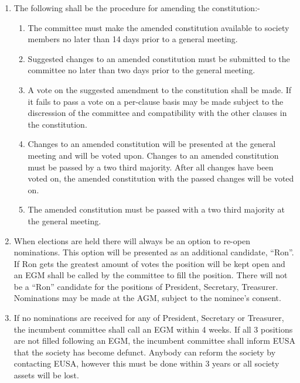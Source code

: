 \documentclass[a4paper]{article}
\begin{document}
\begin{enumerate}
  \item The following shall be the procedure for amending the constitution:-
    \begin{enumerate}
      \item The committee must make the amended constitution available to
        society members no later than 14 days prior to a general meeting.
      \item Suggested changes to an amended constitution must be submitted to
        the committee no later than two days prior to the general meeting.
      \item A vote on the suggested amendment to the constitution shall be
        made. If it fails to pass a vote on a per-clause basis may be made 
        subject to the discression of the committee and compatibility with the 
        other clauses in the constitution.
      \item Changes to an amended constitution will be presented at the general
        meeting and will be voted upon. Changes to an amended constitution
        must be passed by a two third majority. After all changes have been
        voted on, the amended constitution with the passed changes will be
        voted on.
      \item The amended constitution must be passed with a two third majority
        at the general meeting.
    \end{enumerate}
    
  \item When elections are held there will always be an option to re-open nominations.
    This option will be presented as an additional candidate, “Ron”.
    If Ron gets the greatest amount of votes the position will be kept open
    and an EGM shall be called by the committee to fill the position. There
    will not be a “Ron” candidate for the positions of President, Secretary,
    Treasurer. Nominations may be made at the AGM, subject to the nominee's
    consent.

  \item If no nominations are received for any of President, Secretary or Treasurer,
    the incumbent committee shall call an EGM within 4 weeks. If all 3
    positions are not filled following an EGM, the incumbent committee shall
    inform EUSA that the society has become defunct. Anybody can reform
    the society by contacting EUSA, however this must be done within 3 years
    or all society assets will be lost.

\end{enumerate}
\end{document}
